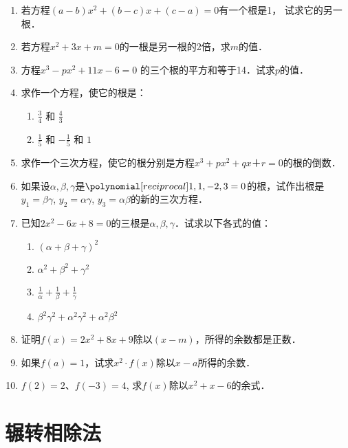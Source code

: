 \begin{enumerate}
\item 若方程$(a-b)x^2+(b-c)x+(c-a)=0$有一个根是1，
试求它的另一根．
\item 若方程$x^2+3x+m=0$的一根是另一根的2倍，求$m$的值．
\item 方程$x^3-px^2+11x-6=0$ 的三个根的平方和等于14．试求$p$的值．
\item 求作一个方程，使它的根是：
\begin{multicols}{2}
    \begin{enumerate}
    \item $\frac{3}{4}$ 和 $\frac{4}{3}$
    \item $\frac{1}{5}$ 和 $-\frac{1}{5}$ 和 $1$
\end{enumerate}
\end{multicols}

\item 求作一个三次方程，使它的根分别是方程$x^3+px^2+qx＋r=0$的根的倒数．

\item 如果设$\alpha,\beta,
\gamma$是$\poly{1,1,-2,3}=0$的根，试作出根是
$y_1=\beta\gamma$, $y_2=\alpha\gamma$, $y_3=\alpha\beta$的新的三次方程．

\item 已知$2x^2-6x+8=0$的三根是$\alpha,\beta,
\gamma$．试求以下各式的值：
\begin{multicols}{2}
    \begin{enumerate}
    \item $(\alpha+\beta+\gamma)^2$ 
    \item $\alpha^2+\beta^2+\gamma^2$ 
    \item $\frac{1}{\alpha}+\frac{1}{\beta}+\frac{1}{\gamma}$
    \item $\beta^2\gamma^2+\alpha^2\gamma^2+\alpha^2\beta^2$
\end{enumerate}
\end{multicols}

\item 证明$f(x)=2x^2+8x+9$除以$(x-m)$，所得的余数都是正数．

\item 如果$f(a)=1$，试求$x^2\cdot f(x)$除以$x-a$所得的余数．

\item $f(2)=2$、$f(-3)=4$, 求$f(x)$除以$x^2+x-6$的余式．

\end{enumerate}


\section{辗转相除法}
